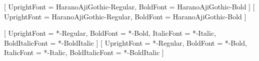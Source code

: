 %
%

\usepackage{luatexja-fontspec}

[
  UprightFont = HaranoAjiGothic-Regular,
  BoldFont    = HaranoAjiGothic-Bold
]
[
  UprightFont = HaranoAjiGothic-Regular,
  BoldFont    = HaranoAjiGothic-Bold
]

\usepackage{fontspec}
\setmainfont{TeX Gyre Heros}[
  UprightFont = *-Regular,
  BoldFont    = *-Bold,
  ItalicFont  = *-Italic,
  BoldItalicFont = *-BoldItalic
]
\setsansfont{TeX Gyre Heros}[
  UprightFont = *-Regular,
  BoldFont    = *-Bold,
  ItalicFont  = *-Italic,
  BoldItalicFont = *-BoldItalic
]

\usepackage{xcolor}

\setcounter{secnumdepth}{4}

\usepackage{indentfirst}

